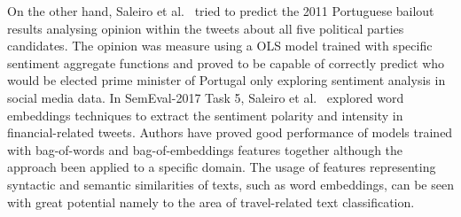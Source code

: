 On the other hand, Saleiro et al.~\cite{saleiro2016sentiment} tried to predict the 2011 Portuguese bailout results analysing opinion within the tweets about all five political parties candidates. The opinion was measure using a \gls{OLS} model trained with specific sentiment aggregate functions and proved to be capable of correctly predict who would be elected prime minister of Portugal only exploring sentiment analysis in social media data. In SemEval-2017 Task 5, Saleiro et al.~\cite{saleiro2017feup} explored word embeddings techniques to extract the sentiment polarity and intensity in financial-related tweets. Authors have proved good performance of models trained with bag-of-words and bag-of-embeddings features together although the approach been applied to a specific domain. The usage of features representing syntactic and semantic similarities of texts, such as word embeddings, can be seen with great potential namely to the area of travel-related text classification.

